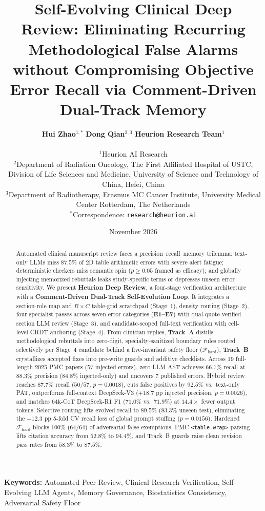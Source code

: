 \documentclass[11pt,a4paper]{article}
\title{\textbf{Self-Evolving Clinical Deep Review: Eliminating Recurring Methodological False Alarms without Compromising Objective Error Recall via Comment-Driven Dual-Track Memory}}
\author{
  \textbf{Hui Zhao}$^{1,*}$ \quad \textbf{Dong Qian}$^{2,3}$ \quad \textbf{Heurion Research Team}$^{1}$ \\[5pt]
  \parbox{0.92\textwidth}{\centering\footnotesize
    $^{1}$Heurion AI Research \\
    $^{2}$Department of Radiation Oncology, The First Affiliated Hospital of USTC, Division of Life Sciences and Medicine, University of Science and Technology of China, Hefei, China \\
    $^{3}$Department of Radiotherapy, Erasmus MC Cancer Institute, University Medical Center Rotterdam, The Netherlands \\[2pt]
    $^{*}$Correspondence: \texttt{research@heurion.ai}
  }
}
\date{November 2026}
\begin{document}
\maketitle

\begin{abstract}
Automated clinical manuscript review faces a precision--recall--memory trilemma: text-only LLMs miss $87.5\%$ of 2D table arithmetic errors with severe alert fatigue; deterministic checkers miss semantic spin ($p \ge 0.05$ framed as efficacy); and globally injecting memorized rebuttals leaks study-specific terms or depresses unseen error sensitivity. We present \textbf{Heurion Deep Review}, a four-stage verification architecture with a \textbf{Comment-Driven Dual-Track Self-Evolution Loop}. It integrates a section-role map and $R \times C$ table-grid scratchpad (Stage~1), density routing (Stage~2), four specialist passes across seven error categories (\textbf{E1--E7}) with dual-quote-verified section LLM review (Stage~3), and candidate-scoped full-text verification with cell-level CRDT anchoring (Stage~4). From clinician replies, \textbf{Track~A} distills methodological rebuttals into zero-digit, specialty-sanitized boundary rules routed selectively per Stage~4 candidate behind a five-invariant safety floor ($\mathcal{F}_{\text{hard}}$); \textbf{Track~B} crystallizes accepted fixes into pre-write guards and additive checklists. Across 19 full-length 2025 PMC papers ($57$ injected errors), zero-LLM AST achieves $66.7\%$ recall at $88.3\%$ precision ($84.8\%$ injected-only) and uncovers $7$ published errors. Hybrid review reaches $87.7\%$ recall ($50/57$, $p=0.0018$), cuts false positives by $92.5\%$ vs.\ text-only PAT, outperforms full-context DeepSeek-V3 ($+18.7\text{ pp}$ injected precision, $p=0.0026$), and matches $64\text{k}$-CoT DeepSeek-R1 F1 ($71.0\%$ vs.\ $71.9\%$) at $14.4\times$ fewer output tokens. Selective routing lifts evolved recall to $89.5\%$ ($83.3\%$ unseen test), eliminating the $-12.3\text{ pp}$ 5-fold CV recall loss of global prompt stuffing ($p=0.0156$). Hardened $\mathcal{F}_{\text{hard}}$ blocks $100\%$ ($64/64$) of adversarial false exemptions, PMC \texttt{<table-wrap>} parsing lifts citation accuracy from $52.8\%$ to $94.4\%$, and Track~B guards raise clean revision pass rates from $58.3\%$ to $87.5\%$.
\end{abstract}

\vspace{3pt}
\noindent\textbf{Keywords:} Automated Peer Review, Clinical Research Verification, Self-Evolving LLM Agents, Memory Governance, Biostatistics Consistency, Adversarial Safety Floor
\end{document}
